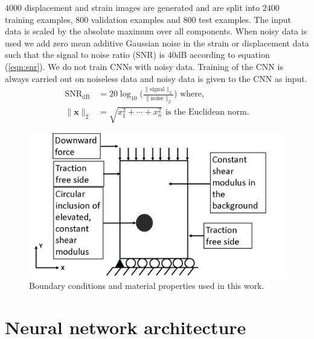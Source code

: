 \documentclass[12pt]{article}
\begin{document}
$4000$ displacement and strain images are generated and are split into $2400$ training examples, $800$ validation examples and $800$ test examples. The input data is scaled by the absolute maximum over all components. When noisy data is used we add zero mean additive Gaussian noise in the strain or displacement data such that the signal to noise ratio (SNR) is 40dB according to equation (\ref{eqn:snr}). We do not train CNNs with noisy data. Training of the CNN is always carried out on noiseless data and noisy data is given to the CNN as input.
\begin{subequations}
\begin{align}
  \text{SNR}_{\text{dB}} &= 20\log_{10}{\Bigg (}\frac{\|\text{signal}\|_{2}}{\|\text{noise}\|_{2}}{\Bigg )} \label{eqn:snr} \text{ where, }\\
  \|\mathbf{x}\|_{2} &= \sqrt{x_{1}^{2}+\cdots+x_{n}^2}  \text{ is the Euclidean norm.}   \label{eqn:eucnorm}
\end{align}
\end{subequations}  
%
\begin{figure}[!h] 
   \centering
    \includegraphics[totalheight=5cm]{Figures/bc.png}
  \caption{\label{fig:bc}Boundary conditions and material properties used in this work. }
\end{figure}
%
\section{Neural network architecture}
\end{document}
